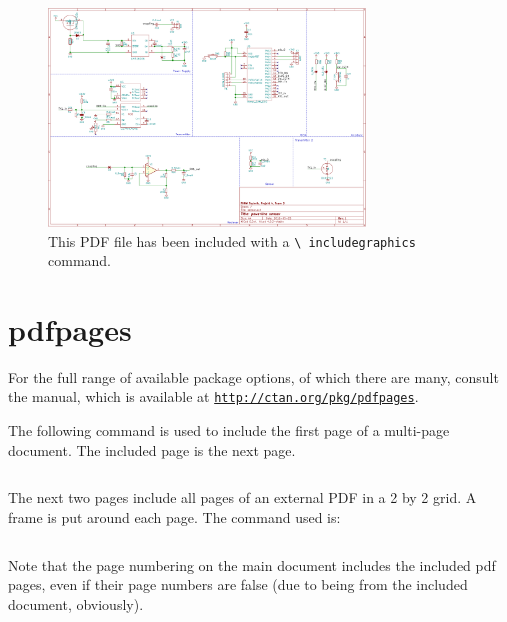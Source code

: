 \documentclass[a4paper,oneside]{article}
\newcommand\code[1]{\texttt{#1}}
\begin{document}
\begin{figure}[h!]
    \centering
    \includegraphics[width=0.75\textwidth]{includes/a4.pdf}
    \caption{%
        This  PDF   file  has   been  included  with   a  \code{\textbackslash
        includegraphics} command.}
    \label{fig:includegraphics}
\end{figure}


\clearpage
\section{pdfpages}
\label{sec:pdfpages}

For   the    full   range   of    available   package   options,    of   which
there   are    many,   consult   the    manual,   which   is    available   at
\href{http://ctan.org/pkg/pdfpages}{\nolinkurl{http://ctan.org/pkg/pdfpages}}.

The  following command  is used  to  include the  first page  of a  multi-page
document.  The included page is the next page.

\begin{verbatim}

\end{verbatim}



The next two pages  include  all pages of an external PDF in  a 2 by 2 grid. A
frame is put around each page. The command used is:

\begin{verbatim}

\end{verbatim}

Note that  the page numbering on  the main document includes  the included pdf
pages, even if  their page numbers are  false (due to being  from the included
document, obviously).
\end{document}
